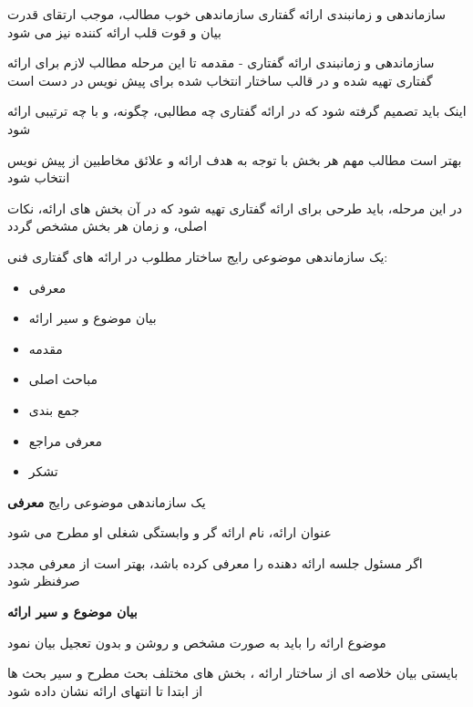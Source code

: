 \documentclass[14pt]{beamer}
\makeatletter
\newcommand{\rtlist}{\raggedleft\rightskip\@totalleftmargin}
\newcommand{\framefontsizelarge}{\fontsize{18pt}{0pt}\selectfont}
\newcommand{\frametitlefontsize}{\fontsize{20pt}{0pt}\selectfont}
\makeatother
\begin{document}
\begin{persian}
\begin{frame}[plain]{\frametitlefontsize سازماندهی و زمانبندی ارائه گفتاری}
		سازماندهی خوب مطالب، موجب ارتقای قدرت بیان و قوت قلب ارائه کننده نیز می شود
	\end{frame}	
	
	\begin{frame}[plain]{\frametitlefontsize سازماندهی و زمانبندی ارائه گفتاری - مقدمه}
		\framefontsizelarge
		تا این مرحله مطالب لازم برای ارائه گفتاری تهیه شده و در قالب ساختار انتخاب شده برای پیش نویس در دست است
		
		اینک باید تصمیم گرفته شود که در ارائه گفتاری چه مطالبی، چگونه، و با چه ترتیبی ارائه شود
		
		بهتر است مطالب مهم هر بخش با توجه به هدف ارائه و علائق مخاطبین از پیش نویس انتخاب شود
		
		در این مرحله، باید طرحی برای ارائه گفتاری تهیه شود که در آن بخش های ارائه، نکات اصلی، و زمان هر بخش مشخص گردد
	\end{frame}	
	
	\begin{frame}[plain]{\frametitlefontsize یک سازماندهی موضوعی رایج}
		\framefontsizelarge
		ساختار مطلوب در ارائه های گفتاری فنی:
		\begin{itemize}\rtlist
			\item معرفی
			\item بیان موضوع و سیر ارائه
			\item مقدمه
			\item مباحث اصلی
			\item جمع بندی
			\item معرفی مراجع
			\item تشکر
		\end{itemize}
	\end{frame}		

	\begin{frame}[plain]{\frametitlefontsize یک سازماندهی موضوعی رایج}
		\framefontsizelarge
		\textbf{معرفی}
		
		عنوان ارائه، نام ارائه گر و وابستگی شغلی او مطرح می شود
		
		اگر مسئول جلسه ارائه دهنده را معرفی کرده باشد، بهتر است از معرفی مجدد صرفنظر شود
		
		\textbf{بیان موضوع و سیر ارائه}
		
		موضوع ارائه را باید به صورت مشخص و روشن و بدون تعجیل بیان نمود
		
		بایستی بیان خلاصه ای از ساختار ارائه ، بخش های مختلف بحث مطرح و سیر بحث ها از ابتدا تا انتهای ارائه نشان داده شود
	\end{frame}		

\end{persian}
\end{document}

